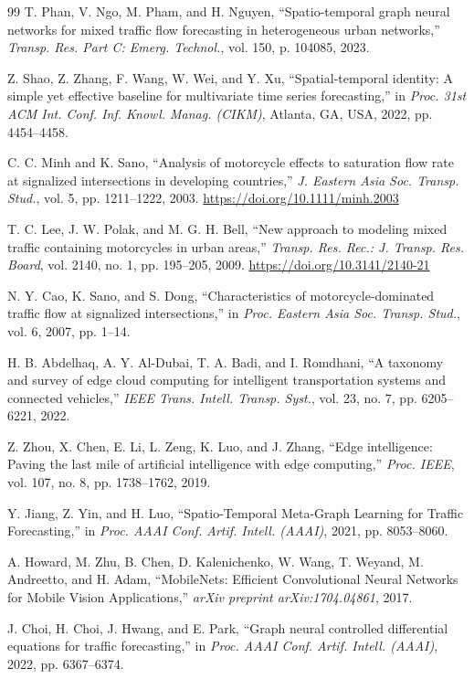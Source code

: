 \documentclass[journal,twocolumn]{IEEEtran}
\begin{document}
\begin{thebibliography}{99}
T. Phan, V. Ngo, M. Pham, and H. Nguyen, ``Spatio-temporal graph neural networks for mixed traffic flow forecasting in heterogeneous urban networks,'' \emph{Transp. Res. Part C: Emerg. Technol.}, vol. 150, p. 104085, 2023.

Z. Shao, Z. Zhang, F. Wang, W. Wei, and Y. Xu, ``Spatial-temporal identity: A simple yet effective baseline for multivariate time series forecasting,'' in \emph{Proc. 31st ACM Int. Conf. Inf. Knowl. Manag. (CIKM)}, Atlanta, GA, USA, 2022, pp. 4454--4458.

C. C. Minh and K. Sano, ``Analysis of motorcycle effects to saturation flow rate at signalized intersections in developing countries,'' \emph{J. Eastern Asia Soc. Transp. Stud.}, vol. 5, pp. 1211--1222, 2003. \url{https://doi.org/10.1111/minh.2003}

T. C. Lee, J. W. Polak, and M. G. H. Bell, ``New approach to modeling mixed traffic containing motorcycles in urban areas,'' \emph{Transp. Res. Rec.: J. Transp. Res. Board}, vol. 2140, no. 1, pp. 195--205, 2009. \url{https://doi.org/10.3141/2140-21}

N. Y. Cao, K. Sano, and S. Dong, ``Characteristics of motorcycle-dominated traffic flow at signalized intersections,'' in \emph{Proc. Eastern Asia Soc. Transp. Stud.}, vol. 6, 2007, pp. 1--14.

H. B. Abdelhaq, A. Y. Al-Dubai, T. A. Badi, and I. Romdhani, ``A taxonomy and survey of edge cloud computing for intelligent transportation systems and connected vehicles,'' \emph{IEEE Trans. Intell. Transp. Syst.}, vol. 23, no. 7, pp. 6205--6221, 2022.

Z. Zhou, X. Chen, E. Li, L. Zeng, K. Luo, and J. Zhang, ``Edge intelligence: Paving the last mile of artificial intelligence with edge computing,'' \emph{Proc. IEEE}, vol. 107, no. 8, pp. 1738--1762, 2019.

Y. Jiang, Z. Yin, and H. Luo, ``Spatio-Temporal Meta-Graph Learning for Traffic Forecasting,'' in \emph{Proc. AAAI Conf. Artif. Intell. (AAAI)}, 2021, pp. 8053--8060.

A. Howard, M. Zhu, B. Chen, D. Kalenichenko, W. Wang, T. Weyand, M. Andreetto, and H. Adam, ``MobileNets: Efficient Convolutional Neural Networks for Mobile Vision Applications,'' \emph{arXiv preprint arXiv:1704.04861}, 2017.

J. Choi, H. Choi, J. Hwang, and E. Park, ``Graph neural controlled differential equations for traffic forecasting,'' in \emph{Proc. AAAI Conf. Artif. Intell. (AAAI)}, 2022, pp. 6367--6374.


\end{thebibliography}
\end{document}

